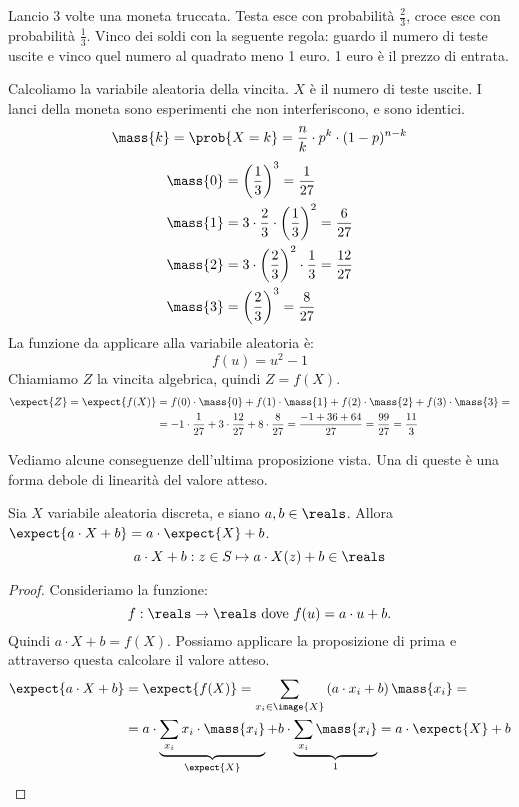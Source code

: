 \begin{exmp}
Lancio 3 volte una moneta truccata. Testa esce con probabilit\`a $\frac{2}{3}$, croce esce con probabilit\`a $\frac{1}{3}$. Vinco dei soldi con la seguente regola: guardo il numero di teste uscite e vinco quel numero al quadrato meno 1 euro. 1 euro \`e il prezzo di entrata.

Calcoliamo la variabile aleatoria della vincita. $X$ \`e il numero di teste uscite. I lanci della moneta sono esperimenti che non interferiscono, e sono identici.
\[
\mass{k} = \prob{X = k} = \frac{n}{k} \cdot p^{k} \cdot (1 - p)^{n - k}
\]
\begin{align*}
\mass{0} &= {\left( \frac{1}{3} \right)}^{3} = \frac{1}{27} \\
\mass{1} &= 3 \cdot \frac{2}{3} \cdot {\left( \frac{1}{3} \right)}^{2} = \frac{6}{27} \\
\mass{2} &= 3 \cdot {\left( \frac{2}{3} \right)}^{2} \cdot \frac{1}{3} = \frac{12}{27} \\
\mass{3} &= {\left( \frac{2}{3} \right)}^{3} = \frac{8}{27}
\end{align*}
La funzione da applicare alla variabile aleatoria \`e:
\[
f(u) = u^2 - 1
\]
Chiamiamo $Z$ la vincita algebrica, quindi $Z = f(X)$.
\begin{align*}
\expect{Z} = \expect{f(X)} &= f(0) \cdot \mass{0} + f(1) \cdot \mass{1} + f(2) \cdot \mass{2} + f(3) \cdot \mass{3} = \\
&= -1 \cdot \frac{1}{27} + 3 \cdot \frac{12}{27} + 8 \cdot \frac{8}{27} = 
\frac{-1 + 36 + 64}{27} = \frac{99}{27} = \frac{11}{3}
\end{align*}
\end{exmp}

Vediamo alcune conseguenze dell'ultima proposizione vista. Una di queste \`e una forma debole di linearit\`a del valore atteso.
\begin{prop}
Sia $X$ variabile aleatoria discreta, e siano $a, b \in \reals$. Allora $\expect{a \cdot X + b} = a \cdot \expect{X} + b$.
\[
a \cdot X + b : {z \in S} \mapsto {a \cdot X (z) + b \in \reals}
\]
\end{prop}
\begin{proof}
Consideriamo la funzione:
\[
f : \reals \to \reals \text{ dove } f(u) = a \cdot u + b.
\]
Quindi $a \cdot X + b = f(X)$. Possiamo applicare la proposizione di prima e attraverso questa calcolare il valore atteso.
\begin{align*}
\expect{a \cdot X + b} &= \expect{f(X)} = \sum_{x_i \in \image{X}} \left( a \cdot x_i + b \right) \mass{x_i} = \\
&= a \cdot \underbrace{\sum_{x_i} x_i \cdot \mass{x_i}}_{\expect{X}} + b \cdot \underbrace{\sum_{x_i} \mass{x_i}}_{1} = a \cdot \expect{X} + b
\end{align*}
\end{proof}

